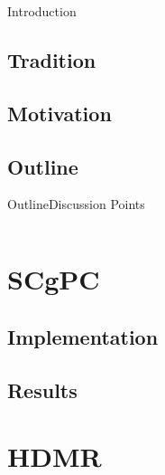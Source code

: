\documentclass{beamer}
\begin{document}
\begin{frame}{Introduction}

\subsection{Tradition}
\subsection{Motivation}
\subsection{Outline}
\begin{frame}{Outline}{Discussion Points}
  \begin{columns}
  \begin{column}{0.1\textwidth}
  \end{column}
  \begin{column}{0.9\textwidth}
    \setcounter{tocdepth}{1}
    \tableofcontents[]
  \end{column}
  \end{columns}
\end{frame}

\AtBeginSection[]{\begin{frame}{Outline}\vspace{-20pt}
  \tableofcontents[currentsection,hideothersubsections]%
\end{frame}}






\section{SCgPC}
\subsection{Implementation}
\subsection{Results}




\section{HDMR}

\end{frame}
\end{document}
